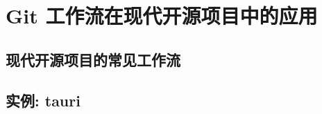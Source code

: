 \documentclass[../main.tex]{subfiles}
\begin{document}
\section{Git 工作流在现代开源项目中的应用}

\subsection{现代开源项目的常见工作流}

\subsection{实例: tauri}
\end{document}

